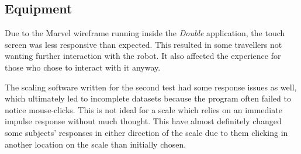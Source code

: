 \subsection{Equipment}
Due to the Marvel wireframe running inside the \textit{Double} application, the touch screen was less responsive than expected. This resulted in some travellers not wanting further interaction with the robot. It also affected the experience for those who chose to interact with it anyway.

The scaling software written for the second test had some response issues as well, which ultimately led to incomplete datasets because the program often failed to notice mouse-clicks. This is not ideal for a scale which relies on an immediate impulse response without much thought. This have almost definitely changed some subjects' responses in either direction of the scale due to them clicking in another location on the scale than initially chosen.